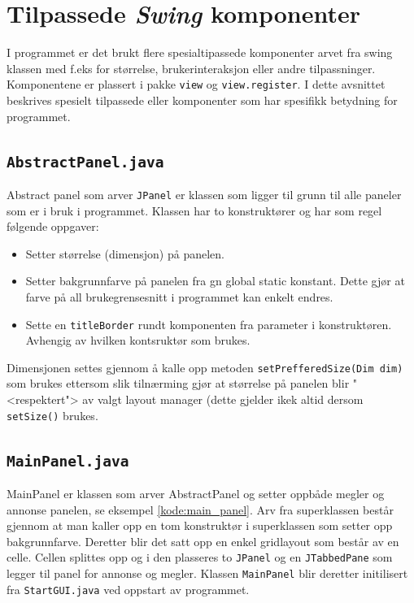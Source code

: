 \section[Swing komponenter]{Tilpassede \emph{Swing} komponenter} \label{sec:swing}
I programmet er det brukt flere spesialtipassede komponenter arvet fra swing klassen med f.eks for størrelse, brukerinteraksjon eller andre tilpassninger. Komponentene er plassert i pakke \texttt{view} og \texttt{view.register}. I dette avsnittet beskrives spesielt tilpassede eller komponenter som har spesifikk betydning for programmet.

\subsection{\texttt{AbstractPanel.java}} \label{subsec:AbstractPanel}
Abstract panel som arver \texttt{JPanel} er klassen som ligger til grunn til alle paneler som er i bruk i programmet. Klassen har to konstruktører og har som regel følgende oppgaver:
\begin{itemize}
\item Setter størrelse (dimensjon) på panelen.
\item Setter bakgrunnfarve på panelen fra gn global static konstant. Dette gjør at farve på all brukegrensesnitt i programmet kan enkelt endres.
\item Sette en \texttt{titleBorder} rundt komponenten fra parameter i konstruktøren. Avhengig av hvilken kontsruktør som brukes.
\end{itemize}
Dimensjonen settes gjennom å kalle opp metoden \texttt{setPrefferedSize(Dim dim)} som brukes ettersom slik tilnærming gjør at størrelse på panelen blir "<respektert"> av valgt layout manager (dette gjelder ikek altid dersom \texttt{setSize()} brukes.




\subsection{\texttt{MainPanel.java}}
MainPanel er klassen som arver AbstractPanel og setter oppbåde megler og annonse panelen, se eksempel \ref{kode:main_panel}. Arv fra superklassen består gjennom at man kaller opp en tom konstruktør i superklassen som setter opp bakgrunnfarve. Deretter blir det satt opp en enkel gridlayout som består av en celle. Cellen splittes opp og i den plasseres to \texttt{JPanel} og en \texttt{JTabbedPane} som legger til panel for annonse og megler. Klassen \texttt{MainPanel} blir deretter initilisert fra \texttt{StartGUI.java} ved oppstart av programmet. 



